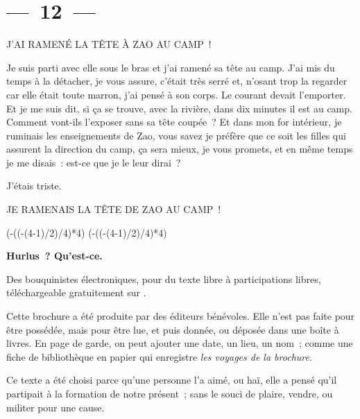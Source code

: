 \documentclass[french,twoside]{book} %
\newcommand{\dateline}[1]{\medskip{\RaggedLeft{#1}\par}\bigskip}
\def\truncdiv#1#2{((#1-(#2-1)/2)/#2)}
\def\moduloop#1#2{(#1-\truncdiv{#1}{#2}*#2)}
\def\modulo#1#2{\number\numexpr\moduloop{#1}{#2}\relax}
\begin{document}
\section[{— 12 —}]{— 12 —}
\renewcommand{\leftmark}{— 12 —}

J’AI RAMENÉ LA TÊTE À ZAO AU CAMP !\par
\bigbreak
\noindent Je suis parti avec elle sous le bras et j’ai ramené sa tête au camp. J’ai mis du temps à la détacher, je vous assure, c’était très serré et, n’osant trop la regarder car elle était toute marron, j’ai pensé à son corps. Le courant devait l’emporter. Et je me suis dit, si ça se trouve, avec la rivière, dans dix minutes il est au camp. Comment vont-ils l’exposer sans sa tête coupée ? Et dans mon for intérieur, je ruminais les enseignements de Zao, vous savez je préfère que ce soit les filles qui assurent la direction du camp, ça sera mieux, je vous promets, et en même temps je me disais : est-ce que je le leur dirai ?\par
J’étais triste.\par
\bigbreak
JE RAMENAIS LA TÊTE DE ZAO AU CAMP !\par

\dateline{Lille, octobre 2016}
 


\ifbooklet
  \pagestyle{empty}
  \clearpage
  \ifnum\modulo{\value{page}}{4}=0 \hbox{}\newpage\hbox{}\newpage\fi
  \ifnum\modulo{\value{page}}{4}=1 \hbox{}\newpage\hbox{}\newpage\fi


  \hbox{}\newpage
  \ifodd\value{page}\hbox{}\newpage\fi
  {\centering\color{rubric}\bfseries\noindent\large
    Hurlus ? Qu’est-ce.\par
    \bigskip
  }
  \noindent Des bouquinistes électroniques, pour du texte libre à participations libres,
  téléchargeable gratuitement sur \href{https://hurlus.fr}{}.\par
  \bigskip
  \noindent Cette brochure a été produite par des éditeurs bénévoles.
  Elle n’est pas faite pour être possédée, mais pour être lue, et puis donnée, ou déposée dans une boîte à livres.
  En page de garde, on peut ajouter une date, un lieu, un nom ;
  comme une fiche de bibliothèque en papier qui enregistre \emph{les voyages de la brochure}.
  \par

  Ce texte a été choisi parce qu’une personne l’a aimé,
  ou haï, elle a pensé qu’il partipait à la formation de notre présent ;
  sans le souci de plaire, vendre, ou militer pour une cause.
  \par
\end{document}
